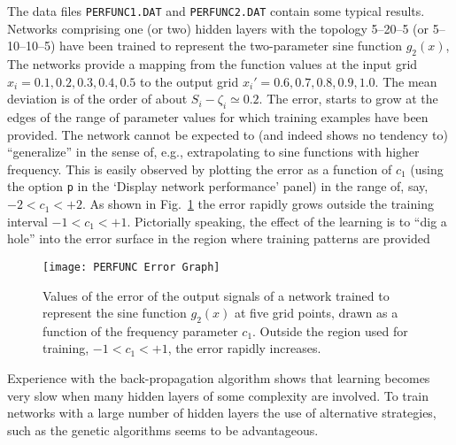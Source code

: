 The data files \texttt{PERFUNC1.DAT} and \texttt{PERFUNC2.DAT} contain some typical results. Networks comprising one (or two) hidden layers with the topology 5--20--5 (or 5--10--10--5) have been trained to represent the two-parameter sine function $g_2(x)$, The networks provide a mapping from the function values at the input grid $x_i=0.1, 0.2, 0.3, 0.4, 0.5$ to the output grid $x_i'=0.6, 0.7, 0.8, 0.9, 1.0$. The mean deviation is of the order of about $S_i-\zeta_i\simeq0.2$. The error, starts to grow at the edges of the range of parameter values for which training examples have been provided. The network cannot be expected to (and indeed shows no tendency to) ``generalize'' in the sense of, e.g., extrapolating to sine functions with higher frequency. This is easily observed by plotting the error as a function of $c_1$ (using the option \texttt{p} in the `Display network performance' panel) in the range of, say, $-2<c_1<+2$. As shown in Fig.~\ref{PERFUNCErrorGraph} the error rapidly grows outside the training interval $-1<c_1<+1$. Pictorially speaking, the effect of the learning is to ``dig a hole'' into the error surface in the region where training patterns are provided
\begin{figure}[h!t]
\centering
\texttt{[image: PERFUNC Error Graph]}
\caption{Values of the error of the output signals of a network trained to represent the sine function $g_2(x)$ at five grid points, drawn as a function of the frequency parameter $c_1$. Outside the region used for training, $-1<c_1<+1$, the error rapidly increases.}\label{PERFUNCErrorGraph}
\end{figure}

Experience with the back-propagation algorithm shows that learning becomes very slow when many hidden layers of some complexity are involved. To train networks with a large number of hidden layers the use of alternative strategies, such as the genetic algorithms seems to be advantageous.
